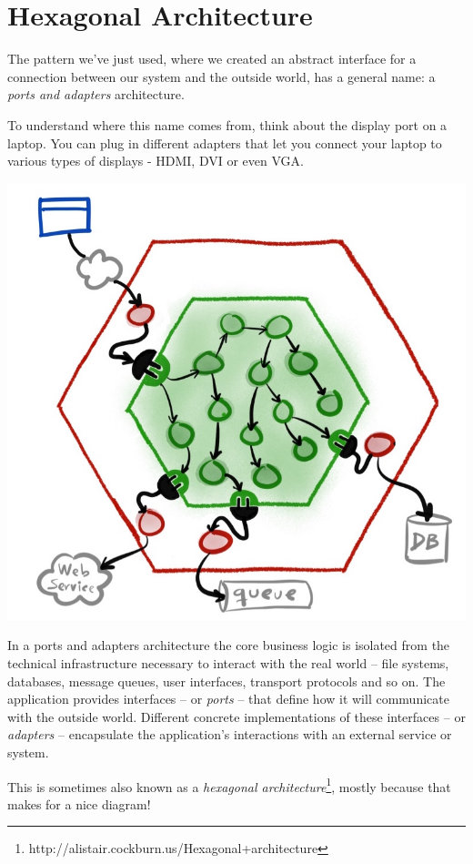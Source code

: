 \chapter*{Hexagonal Architecture}

The pattern we've just used, where we created an abstract interface for a connection between our system and the outside world, has a general name: a \emph{ports and adapters} architecture.

To understand where this name comes from, think about the display port on a laptop. You can plug in different adapters that let you connect your laptop to various types of displays - HDMI, DVI or even VGA.

\includegraphics[width=\textwidth]{images/hexagonal-architecture}

In a ports and adapters architecture the core business logic is isolated from the technical infrastructure necessary to interact with the real world -- file systems, databases, message queues, user interfaces, transport protocols and so on. The application provides interfaces -- or \emph{ports} -- that define how it will communicate with the outside world. Different concrete implementations of these interfaces -- or \emph{adapters} -- encapsulate the application's interactions with an external service or system.

This is sometimes also known as a \emph{hexagonal architecture}\footnote{http://alistair.cockburn.us/Hexagonal+architecture}, mostly because that makes for a nice diagram!

